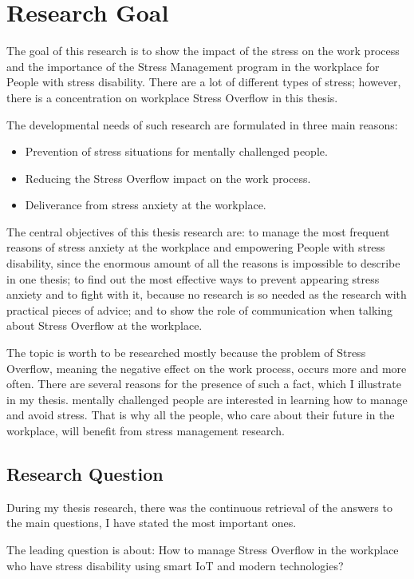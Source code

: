 \section{Research Goal}
The goal of this research is to show the impact of the stress on the work process and the importance of the Stress Management program in the workplace for People with stress disability. There are a lot of different types of stress; however, there is a concentration on workplace Stress Overflow in this thesis.

The developmental needs of such research are formulated in three main reasons:
\begin{itemize}
    \item Prevention of stress situations for mentally challenged people.
    \item Reducing the Stress Overflow impact on the work process.
    \item Deliverance from stress anxiety at the workplace.
\end{itemize}
The central objectives of this thesis research are: to manage the most frequent reasons of stress anxiety at the workplace and empowering People with stress disability, since the enormous amount of all the reasons is impossible to describe in one thesis; to find out the most effective ways to prevent appearing stress anxiety and to fight with it, because no research is so needed as the research with practical pieces of advice; and to show the role of communication when talking about Stress Overflow at the workplace.

The topic is worth to be researched mostly because the problem of Stress Overflow, meaning the negative effect on the work process, occurs more and more often. There are several reasons for the presence of such a fact, which I illustrate in my thesis. mentally challenged people are interested in learning how to manage and avoid stress. That is why all the people, who care about their future in the workplace, will benefit from stress management research. 

\subsection{Research Question}
During my thesis research, there was the continuous retrieval of the answers to the main questions, I have stated the most important ones.

The leading question is about: How to manage Stress Overflow in the workplace who have stress disability using smart \ac{IoT} and modern technologies?


